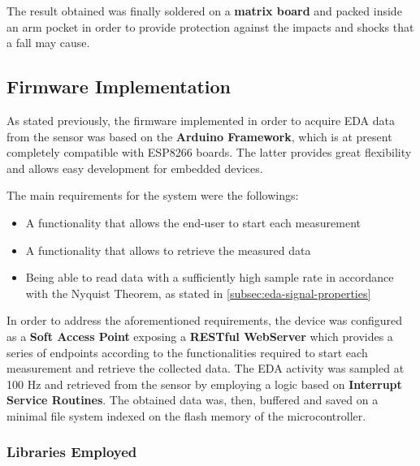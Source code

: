 The result obtained was finally soldered on a \textbf{matrix board} and packed inside an arm pocket in order to provide protection against the impacts and shocks that a fall may cause.  

\subsection{Firmware Implementation}\label{subsec:firmware-implementation}

As stated previously, the firmware implemented in order to acquire EDA data from the sensor was based on the \textbf{Arduino Framework}, which is at present completely compatible with ESP8266 boards. The latter provides great flexibility and allows easy development for embedded devices. 

The main requirements for the system were the followings:

\begin{itemize}
    \item A functionality that allows the end-user to start each measurement
    \item A functionality that allows to retrieve the measured data
    \item Being able to read data with a sufficiently high sample rate in accordance with the Nyquist Theorem, as stated in \ref{subsec:eda-signal-properties}
\end{itemize}

%
%

In order to address the aforementioned requirements, the device was configured as a \textbf{Soft Access Point} exposing a \textbf{RESTful WebServer} which provides a series of endpoints according to the functionalities required to start each measurement and retrieve the collected data. The EDA activity was sampled at 100 Hz and retrieved from the sensor by employing a logic based on \textbf{Interrupt Service Routines}. The obtained data was, then, buffered and saved on a minimal file system indexed on the flash memory of the microcontroller.

\subsubsection{Libraries Employed}\label{subsubsec:libraries-employed}

